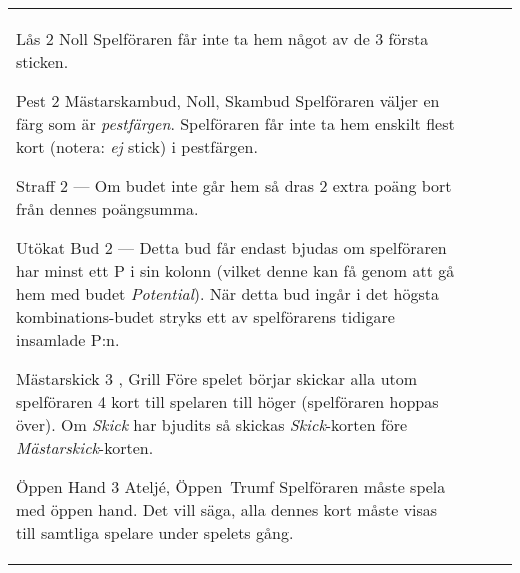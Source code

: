 \begin{table}
\begin{center}
\begin{tabularx}{\textwidth}{
			l
			S[table-number-alignment=center, table-figures-decimal=0]
			p{3cm}
			|X
		}
			\specialBidItem%
			{Lås}
			{2}
			{Noll}
			{%
				Spelföraren får inte ta hem något av de 3 första sticken.
			}

			\specialBidItem%
			{Pest}
			{2}
			{Mästarskambud, Noll, Skambud}
			{%
				Spelföraren väljer en färg som är \emph{pestfärgen}. Spelföraren får inte ta hem enskilt flest kort (notera: \emph{ej} stick) i pestfärgen.
			}

			\specialBidItem%
			{Straff}
			{2}
			{---}
			{%
				Om budet inte går hem så dras 2 extra poäng bort från dennes poängsumma.
			}

			\specialBidItem%
			{Utökat Bud}
			{2}
			{---}
			{%
				Detta bud får endast bjudas om spelföraren har minst ett P i sin kolonn (vilket denne kan få genom att gå hem med budet \emph{Potential}). När detta bud ingår i det högsta kombinations-budet stryks ett av spelförarens tidigare insamlade P:n.
			}

			\specialBidItem%
			{Mästarskick}
			{3}
			{\nonTrump, Grill}
			{%
				Före spelet börjar skickar alla utom spelföraren 4 kort till spelaren till höger (spelföraren hoppas över). Om \emph{Skick} har bjudits så skickas \emph{Skick}-korten före \emph{Mästarskick}-korten.
			}

			\specialBidItem%
			{Öppen Hand}
			{3}
			{Ateljé, Öppen~Trumf}
			{%
				Spelföraren måste spela med öppen hand. Det vill säga, alla dennes kort måste visas till samtliga spelare under spelets gång.
			}
		\end{tabularx}
	\end{center}
\end{table}
